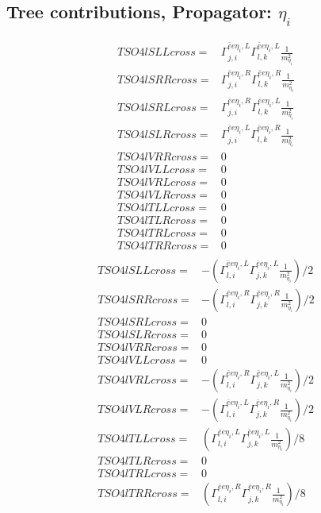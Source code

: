 \documentclass[A4,landscape]{article}
\begin{document}
\subsection{Tree contributions, Propagator: $\eta_i$} 

\begin{align} 
  TSO4lSLLcross= & \Gamma^{\bar{e}e \eta_i ,L}_{j, i} \Gamma^{\bar{e}e \eta_i ,L}_{l, k} \frac{1}{m^2_{\eta_i}} \\ 
  TSO4lSRRcross= & \Gamma^{\bar{e}e \eta_i ,R}_{j, i} \Gamma^{\bar{e}e \eta_i ,R}_{l, k} \frac{1}{m^2_{\eta_i}} \\ 
  TSO4lSRLcross= & \Gamma^{\bar{e}e \eta_i ,R}_{j, i} \Gamma^{\bar{e}e \eta_i ,L}_{l, k} \frac{1}{m^2_{\eta_i}} \\ 
  TSO4lSLRcross= & \Gamma^{\bar{e}e \eta_i ,L}_{j, i} \Gamma^{\bar{e}e \eta_i ,R}_{l, k} \frac{1}{m^2_{\eta_i}} \\ 
  TSO4lVRRcross= & 0 \\ 
  TSO4lVLLcross= & 0 \\ 
  TSO4lVRLcross= & 0 \\ 
  TSO4lVLRcross= & 0 \\ 
  TSO4lTLLcross= & 0 \\ 
  TSO4lTLRcross= & 0 \\ 
  TSO4lTRLcross= & 0 \\ 
  TSO4lTRRcross= & 0 \\ 
\end{align} 
\begin{align} 
  TSO4lSLLcross= & -(\Gamma^{\bar{e}e \eta_i ,L}_{l, i} \Gamma^{\bar{e}e \eta_i ,L}_{j, k} \frac{1}{m^2_{\eta_i}})/2 \\ 
  TSO4lSRRcross= & -(\Gamma^{\bar{e}e \eta_i ,R}_{l, i} \Gamma^{\bar{e}e \eta_i ,R}_{j, k} \frac{1}{m^2_{\eta_i}})/2 \\ 
  TSO4lSRLcross= & 0 \\ 
  TSO4lSLRcross= & 0 \\ 
  TSO4lVRRcross= & 0 \\ 
  TSO4lVLLcross= & 0 \\ 
  TSO4lVRLcross= & -(\Gamma^{\bar{e}e \eta_i ,R}_{l, i} \Gamma^{\bar{e}e \eta_i ,L}_{j, k} \frac{1}{m^2_{\eta_i}})/2 \\ 
  TSO4lVLRcross= & -(\Gamma^{\bar{e}e \eta_i ,L}_{l, i} \Gamma^{\bar{e}e \eta_i ,R}_{j, k} \frac{1}{m^2_{\eta_i}})/2 \\ 
  TSO4lTLLcross= & (\Gamma^{\bar{e}e \eta_i ,L}_{l, i} \Gamma^{\bar{e}e \eta_i ,L}_{j, k} \frac{1}{m^2_{\eta_i}})/8 \\ 
  TSO4lTLRcross= & 0 \\ 
  TSO4lTRLcross= & 0 \\ 
  TSO4lTRRcross= & (\Gamma^{\bar{e}e \eta_i ,R}_{l, i} \Gamma^{\bar{e}e \eta_i ,R}_{j, k} \frac{1}{m^2_{\eta_i}})/8 \\ 
\end{align} 
\end{document}
